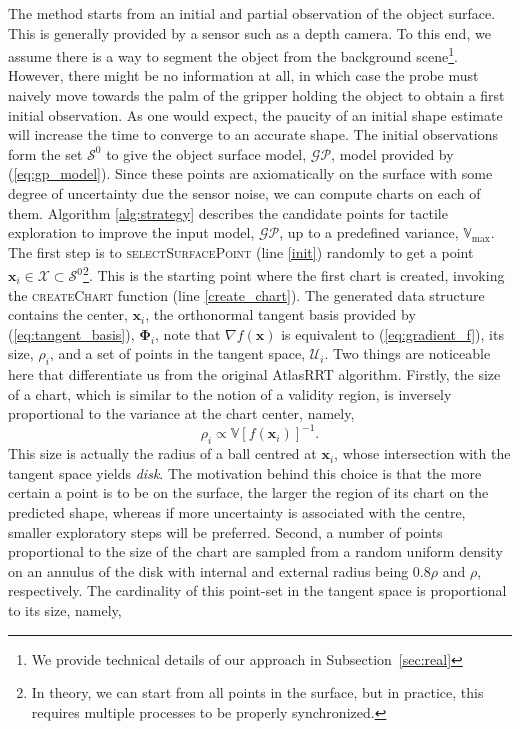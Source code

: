 The method starts from an initial and partial observation of the object surface. This is generally provided by a sensor such as a depth camera. To this end, we assume there is a way to segment the object from the background scene\footnote{We provide technical details of our approach in Subsection~\ref{sec:real}}. However, there might be no information at all, in which case the probe must naively move towards the palm of the gripper holding the object to obtain a first initial observation. As one would expect, the paucity of an initial shape estimate will increase the time to converge to an accurate shape. The initial observations form the set $\mathcal{S}^0$ to give the object surface model, $\mathcal{GP}$, model provided by (\ref{eq:gp_model}). Since these points are axiomatically on the surface with some degree of uncertainty due the sensor noise, we can compute charts on each of them.
Algorithm \ref{alg:strategy} describes the candidate points for tactile exploration to improve the input model, $\mathcal{GP}$, up to a predefined variance, $\mathbb{V}_{\max}$. 
The first step is to \textsc{selectSurfacePoint} (line \ref{init}) randomly to get a point $\mathbf{x}_i \in \mathcal{X} \subset \mathcal{S}^0$\footnote{In theory, we can start from all points in the surface, but in practice, this requires multiple processes to be properly synchronized.}. This is the starting point where the first chart is created, invoking the \textsc{createChart} function (line \ref{create_chart}). The generated data structure contains the center, $\mathbf{x}_i$, the orthonormal tangent basis provided by (\ref{eq:tangent_basis}), $\boldsymbol{\Phi}_i$, note that $\nabla f(\mathbf{x})$ is equivalent to (\ref{eq:gradient_f}), its size, $\rho_i$, and a set of points in the tangent space, $\mathcal{U}_i$. Two things are noticeable here that differentiate us from the original AtlasRRT algorithm. Firstly, the size of a chart, which is similar to the notion of a validity region, is inversely proportional to the variance at the chart center, namely,
\begin{equation}
\rho_i \propto \mathbb{V}[f(\mathbf{x}_i)]^{-1}.
\end{equation}
This size is actually the radius of a ball centred at $\mathbf{x}_i$, whose intersection with the tangent space yields \emph{disk}. The motivation behind this choice is that the more certain a point is to be on the surface, the larger the region of its chart on the predicted shape, whereas if more uncertainty is associated with the centre, smaller exploratory steps will be preferred. Second, a number of points proportional to the size of the chart are sampled from a random uniform density on an annulus of the disk with internal and external radius being $0.8\rho$ and $\rho$, respectively. The cardinality of this point-set in the tangent space is proportional to its size, namely,
